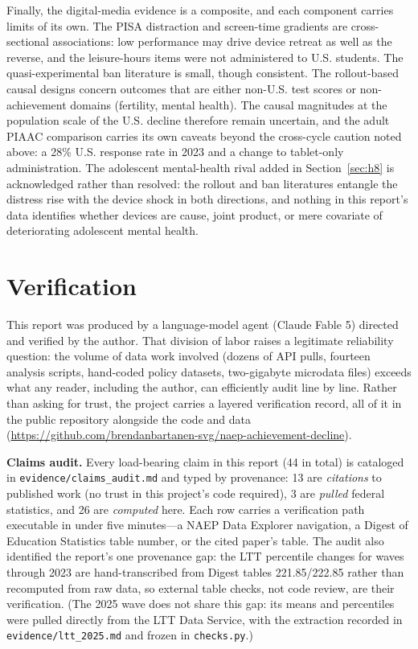 \documentclass[11pt]{article}
\begin{document}
Finally, the digital-media evidence is a composite, and each component carries limits of its own. The PISA distraction and screen-time gradients are cross-sectional associations: low performance may drive device retreat as well as the reverse, and the leisure-hours items were not administered to U.S. students. The quasi-experimental ban literature is small, though consistent. The rollout-based causal designs concern outcomes that are either non-U.S. test scores or non-achievement domains (fertility, mental health). The causal magnitudes at the population scale of the U.S. decline therefore remain uncertain, and the adult PIAAC comparison carries its own caveats beyond the cross-cycle caution noted above: a 28\% U.S. response rate in 2023 and a change to tablet-only administration. The adolescent mental-health rival added in Section~\ref{sec:h8} is acknowledged rather than resolved: the rollout and ban literatures entangle the distress rise with the device shock in both directions, and nothing in this report's data identifies whether devices are cause, joint product, or mere covariate of deteriorating adolescent mental health.

\section{Verification}
\label{sec:verification}

This report was produced by a language-model agent (Claude Fable 5) directed and verified by the author. That division of labor raises a legitimate reliability question: the volume of data work involved (dozens of API pulls, fourteen analysis scripts, hand-coded policy datasets, two-gigabyte microdata files) exceeds what any reader, including the author, can efficiently audit line by line. Rather than asking for trust, the project carries a layered verification record, all of it in the public repository alongside the code and data (\url{https://github.com/brendanbartanen-svg/naep-achievement-decline}).

\textbf{Claims audit.} Every load-bearing claim in this report (44 in total) is cataloged in \texttt{evidence/claims\_audit.md} and typed by provenance: 13 are \emph{citations} to published work (no trust in this project's code required), 3 are \emph{pulled} federal statistics, and 26 are \emph{computed} here. Each row carries a verification path executable in under five minutes---a NAEP Data Explorer navigation, a Digest of Education Statistics table number, or the cited paper's table. The audit also identified the report's one provenance gap: the LTT percentile changes for waves through 2023 are hand-transcribed from Digest tables 221.85/222.85 rather than recomputed from raw data, so external table checks, not code review, are their verification. (The 2025 wave does not share this gap: its means and percentiles were pulled directly from the LTT Data Service, with the extraction recorded in \texttt{evidence/ltt\_2025.md} and frozen in \texttt{checks.py}.)
\end{document}
